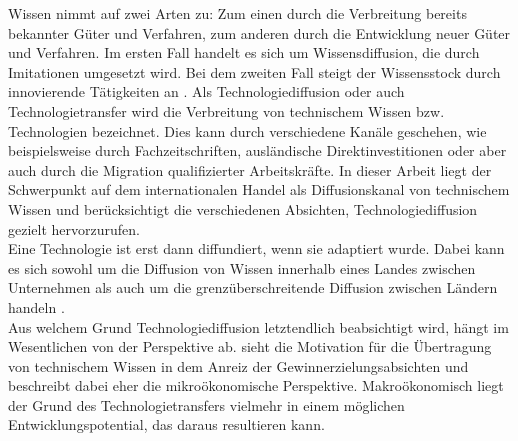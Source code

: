 %
Wissen nimmt auf zwei Arten zu: Zum einen durch die Verbreitung bereits bekannter Güter und Verfahren, zum anderen durch die Entwicklung neuer Güter und Verfahren. Im ersten Fall handelt es sich um Wissensdiffusion, die durch Imitationen umgesetzt wird. Bei dem zweiten Fall steigt der Wissensstock durch innovierende Tätigkeiten an \cite{Schmookler.1966}.
Als Technologiediffusion oder auch Technologietransfer wird die Verbreitung von technischem Wissen bzw. Technologien bezeichnet. Dies kann durch verschiedene Kanäle geschehen, wie beispielsweise durch Fachzeitschriften, ausländische Direktinvestitionen oder aber auch durch die Migration qualifizierter Arbeitskräfte. In dieser Arbeit liegt der Schwerpunkt auf dem internationalen Handel als Diffusionskanal von technischem Wissen und berücksichtigt die verschiedenen Absichten, Technologiediffusion gezielt hervorzurufen.\\
%
Eine Technologie ist erst dann diffundiert, wenn sie adaptiert wurde. Dabei kann es sich sowohl um die Diffusion von Wissen innerhalb eines Landes zwischen Unternehmen als auch um die grenzüberschreitende Diffusion zwischen Ländern handeln \cite[Kapitel 18, S. 611]{Acemoglu.2009}.\\
%
Aus welchem Grund Technologiediffusion letztendlich beabsichtigt wird, hängt im Wesentlichen von der Perspektive ab. \cite{Arrow.1969} sieht die Motivation für die Übertragung von technischem Wissen in dem Anreiz der Gewinnerzielungsabsichten und beschreibt dabei eher die mikroökonomische Perspektive. Makroökonomisch liegt der Grund des Technologietransfers vielmehr in einem möglichen Entwicklungspotential, das daraus resultieren kann.\\
%

